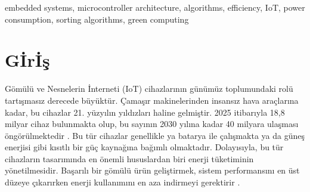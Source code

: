 \documentclass[conference, a4paper]{IEEEtran}
\begin{document}
\begin{abstract}
Power usage is a crucial point for embedded/IoT devices. Historically, theoretical time complexities were utilized during the choice of algorithm for these devices. But how accurate is this? In this research; Bubble, Insertion, Merge, Quick, Heap, Gnome, Radix, Shell, Comb and Pancake Sort algorithms have been ran on Arduino Uno R3 and R4 and current draws have been measured. Combining this with voltage, total power consumption has been calculated. The results show a [0.98, 1.0] correlation between the theoretical time complexities and power consumptions (p < 0.0001). The results indicate that optimizing for time spent also optimizes for power consumption. Comparison of power consumption of code generated by different large language models have also been analyzed and some preliminary results have been found.
\end{abstract}
\begin{IEEEkeywords}
embedded systems,
microcontroller architecture,
algorithms, efficiency,
IoT,
power consumption,
sorting algorithms,
green computing
\end{IEEEkeywords}



%
\IEEEpeerreviewmaketitle

\IEEEpubidadjcol


\section{G{\footnotesize İ}r{\footnotesize İ}ş}

Gömülü ve Nesnelerin İnterneti (IoT) cihazlarının günümüz toplumundaki rolü tartışmasız derecede büyüktür. Çamaşır makinelerinden insansız hava araçlarına kadar, bu cihazlar 21. yüzyılın yıldızları haline gelmiştir. 2025 itibarıyla 18,8 milyar cihaz bulunmakta olup, bu sayının 2030 yılına kadar 40 milyara ulaşması öngörülmektedir \cite{iot-market-2024-summer}. Bu tür cihazlar genellikle ya batarya ile çalışmakta ya da güneş enerjisi gibi kısıtlı bir güç kaynağına bağımlı olmaktadır. Dolayısıyla, bu tür cihazların tasarımında en önemli hususlardan biri enerji tüketiminin yönetilmesidir. Başarılı bir gömülü ürün geliştirmek, sistem performansını en üst düzeye çıkarırken enerji kullanımını en aza indirmeyi gerektirir \cite{bces-embedded-performance-energy-consumption-eval}.
\end{document}
